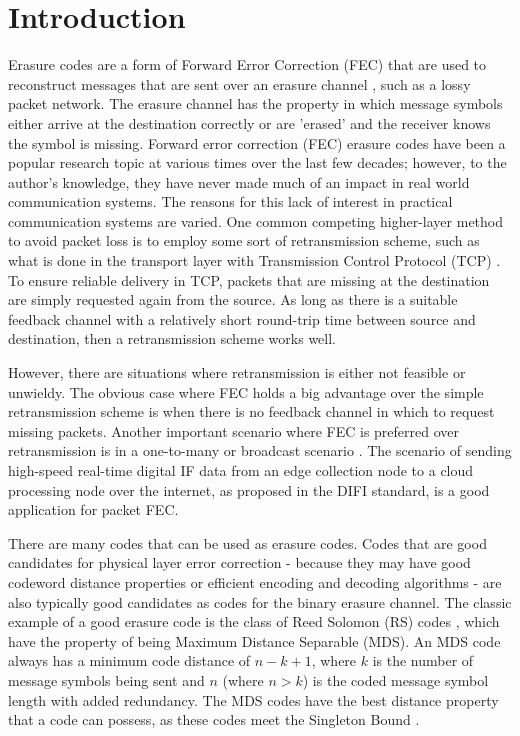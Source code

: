 \documentclass[conference]{IEEEtran}
\begin{document}
\section{Introduction}
Erasure codes are a form of Forward Error Correction (FEC) that are used to reconstruct messages that are sent over an erasure channel \cite{CovTho91}, such as a lossy packet network.  The erasure channel has the property in which message symbols either arrive at the destination correctly or are 'erased' and the receiver knows the symbol is missing.  Forward error correction (FEC) erasure codes have been a popular research topic at various times over the last few decades; however, to the author's knowledge, they have never made much of an impact in real world communication systems.  The reasons for this lack of interest in practical communication systems are varied.  One common competing higher-layer method to avoid packet loss is to employ some sort of retransmission scheme, such as what is done in the transport layer with Transmission Control Protocol (TCP) \cite{cerf-74}.  To ensure reliable delivery in TCP, packets that are missing at the destination are simply requested again from the source.  As long as there is a suitable feedback channel with a relatively short round-trip time between source and destination, then a retransmission scheme works well.  

However, there are situations where retransmission is either not feasible or unwieldy.  The obvious case where FEC holds a big advantage over the simple retransmission scheme is when there is no feedback channel in which to request missing packets.  Another important scenario where FEC is preferred over retransmission is in a one-to-many or broadcast scenario \cite{luby-07}.  The scenario of sending high-speed real-time digital IF data from an edge collection node to a cloud processing node over the internet, as proposed in the DIFI standard, is a good application for packet FEC.

There are many codes that can be used as erasure codes.  Codes that are good candidates for physical layer error correction - because they may have good codeword distance properties or efficient encoding and decoding algorithms - are also typically good candidates as codes for the binary erasure channel.  The classic example of a good erasure code is the class of Reed Solomon (RS) codes \cite{reed-1960}, which have the property of being Maximum Distance Separable (MDS).  An MDS code always has a minimum code distance of $n-k+1$, where $k$ is the number of message symbols being sent and $n$ (where $n > k$) is the coded message symbol length with added redundancy.  The MDS codes have the best distance property that a code can possess, as these codes meet the Singleton Bound \cite{Singleton-64}.  
\end{document}
